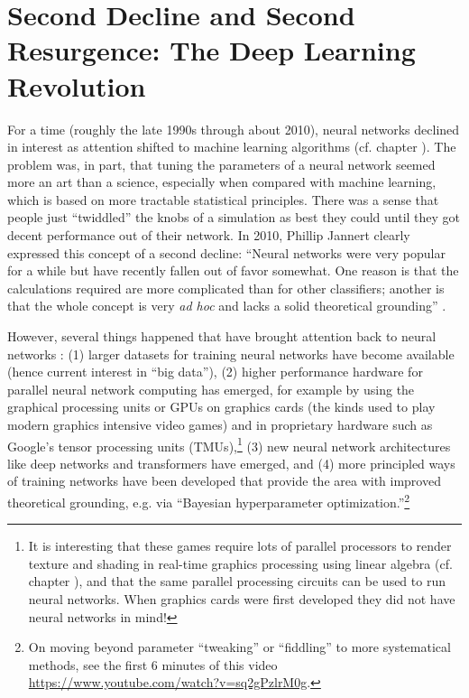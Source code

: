 \section{Second Decline and Second Resurgence: The Deep Learning Revolution}\label{deep_revolution}


For a time (roughly the late 1990s through about 2010), neural networks declined in interest as attention shifted to machine learning algorithms (cf. chapter ). The problem was, in part, that tuning the parameters of a neural network seemed more an art than a science, especially when compared with machine learning, which is based on more tractable statistical principles. There was a sense that people just ``twiddled''  the knobs of a simulation as best they could until they got decent performance out of their network. In 2010, Phillip Jannert clearly expressed this concept of a second decline: ``Neural networks were very popular for a while but have recently fallen out of favor somewhat. One reason is that the calculations required are more complicated than for other classifiers; another is that the whole concept is very \emph{ad hoc} and lacks a solid theoretical grounding'' \cite[Ch. 18]{janert2010data}.

However, several things happened that have brought attention back to neural networks : (1) larger datasets for training neural networks have become available (hence current interest in ``big data''), (2) higher performance hardware for parallel neural network computing has emerged, for example by using the graphical processing units or GPUs on graphics cards (the kinds used to play modern graphics intensive video games) and in proprietary hardware such as Google's tensor processing units (TMUs),\footnote{It is interesting that these games require lots of parallel processors to render texture and shading in real-time graphics processing using linear algebra (cf. chapter ), and that the same parallel processing circuits can be used to run neural networks. When graphics cards were first developed they did not have neural networks in mind!} (3) new neural network architectures like deep networks and transformers have emerged, and (4) more principled ways of training networks have been developed that provide the area with improved  theoretical grounding, e.g. via ``Bayesian hyperparameter optimization.''\footnote{On moving beyond parameter ``tweaking'' or ``fiddling'' to more systematical methods, see the first 6 minutes of this video \url{https://www.youtube.com/watch?v=sq2gPzlrM0g}.}

